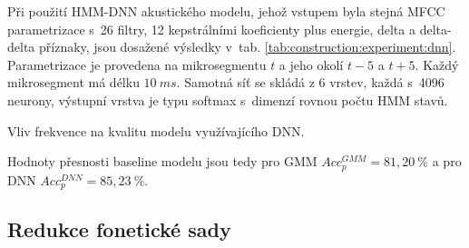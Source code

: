 Při použití HMM-DNN akustického modelu, jehož vstupem byla stejná MFCC parametrizace s~26 filtry, 12 kepstrálními koeficienty plus energie, delta a delta-delta příznaky, jsou dosažené výsledky v~tab. \ref{tab:construction:experiment:dnn}.
Parametrizace je provedena na mikrosegmentu $t$ a jeho okolí $t-5$ a $t+5$.
Každý mikrosegment má délku $10\ ms$.
Samotná síť se skládá z 6 vrstev, každá s~4096 neurony, výstupní vrstva je typu softmax s~dimenzí rovnou počtu HMM stavů.

\begin{table}[htpb]
  \centering
  \def\arraystretch{1.5}
  \caption{Vliv frekvence na kvalitu modelu využívajícího DNN.}
  \label{tab:construction:experiment:dnn}
\end{table}

\noindent Hodnoty přesnosti baseline modelu jsou tedy pro GMM $Acc_{p}^{GMM} = 81,20~\%$ a pro DNN $Acc_{p}^{DNN} = 85,23~\%$.

\subsection{Redukce fonetické sady}
\label{chap:construction:results:reduction}

